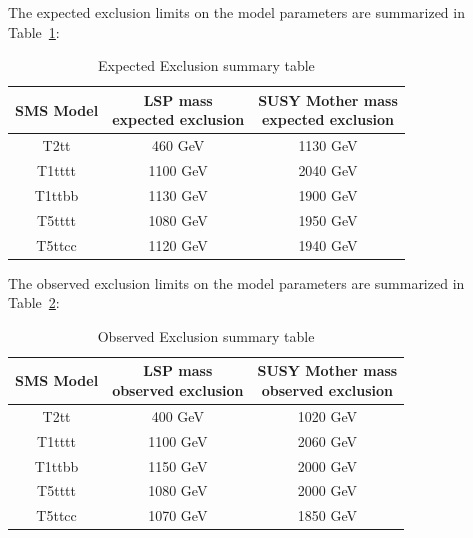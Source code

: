 The expected exclusion limits on the model parameters are summarized in Table~\ref{tab:c4limitsummary_exp}:

\begin{table}[htbp]
\fontsize{10 pt}{1.2 em}
\selectfont
\begin{centering}
\caption{\label{tab:c4limitsummary_exp} Expected Exclusion summary table}
\hspace*{-4ex}
\begin{tabular}{|c|c|c|}
\hline
SMS Model & \specialcell{LSP mass \\ expected exclusion} & \specialcell{SUSY Mother mass \\ expected exclusion} \\
\hline
T2tt & 460 GeV & 1130 GeV \\
\hline
T1tttt & 1100 GeV & 2040 GeV \\
\hline
T1ttbb & 1130 GeV & 1900 GeV \\
\hline
T5tttt & 1080 GeV & 1950 GeV \\
\hline
T5ttcc & 1120 GeV & 1940 GeV \\
\hline
\end{tabular}
\par\end{centering}
\end{table}

The observed exclusion limits on the model parameters are summarized in Table~\ref{tab:c4limitsummary_obs}:

\begin{table}[htbp]
\fontsize{10 pt}{1.2 em}
\selectfont
\begin{centering}
\caption{\label{tab:c4limitsummary_obs} Observed Exclusion summary table}
\hspace*{-4ex}
\begin{tabular}{|c|c|c|}
\hline
SMS Model & \specialcell{LSP mass \\ observed exclusion} & \specialcell{SUSY Mother mass \\ observed exclusion} \\
\hline
T2tt & 400 GeV & 1020 GeV \\
\hline
T1tttt & 1100 GeV & 2060 GeV \\
\hline
T1ttbb & 1150 GeV & 2000 GeV \\
\hline
T5tttt & 1080 GeV & 2000 GeV \\
\hline
T5ttcc & 1070 GeV & 1850 GeV \\
\hline
\end{tabular}
\par\end{centering}
\end{table}
